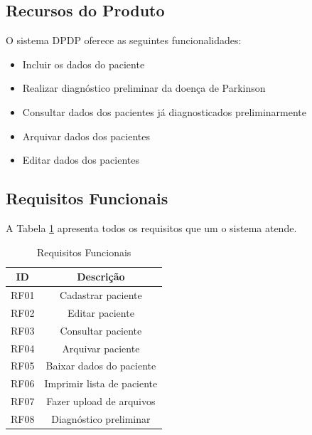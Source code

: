 \begin{apendicesenv}
    \subsection{Recursos do Produto}

    O sistema DPDP oferece as seguintes funcionalidades:

    \begin{itemize}
        \item Incluir os dados do paciente
        \item Realizar diagnóstico preliminar da doença de Parkinson
        \item Consultar dados dos pacientes já diagnosticados preliminarmente
        \item Arquivar dados dos pacientes
        \item Editar dados dos pacientes
    \end{itemize}

    \subsection{Requisitos Funcionais}

    A Tabela \ref{table:Requisitos Funcionais} apresenta todos os requisitos que um o sistema atende.

    \begin{table}[ht!]
        \centering
        \caption{Requisitos Funcionais}
        \begin{tabular}{@{}|c|c|@{}}
            \hline
            \textbf{ID} & \textbf{Descrição}         \\ \hline
            RF01        & Cadastrar paciente         \\ \hline
            RF02        & Editar paciente            \\ \hline
            RF03        & Consultar paciente         \\ \hline
            RF04        & Arquivar paciente          \\ \hline
            RF05        & Baixar dados do paciente   \\ \hline
            RF06        & Imprimir lista de paciente \\ \hline
            RF07        & Fazer upload de arquivos   \\ \hline
            RF08        & Diagnóstico preliminar     \\ \hline
        \end{tabular}
        \label{table:Requisitos Funcionais}
    \end{table}


\end{apendicesenv}
